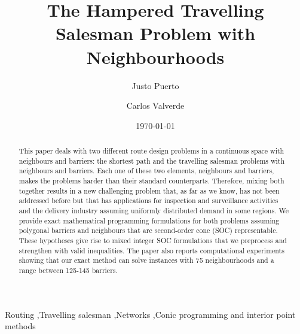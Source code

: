 \documentclass[a4paper,  review, authoryear, 1p., doubleblind]{elsarticle}
\begin{document}
	
	\begin{frontmatter}
		
		\title{The Hampered Travelling Salesman Problem with Neighbourhoods}
		
		\author[1]{Justo Puerto }%
		
		\author[2]{Carlos Valverde }
		
		\address[1]{Department of Statistics and Operations Research, University of Seville, Seville, 41012, Spain}
		\address[2]{Department of Statistics and Operations Research, University of Seville, Seville, 41012, Spain}
		
		
		\date{\today}
		
		
		\begin{abstract}
			This paper deals with two different route design problems in a continuous space with neighbours and barriers: the shortest path and the travelling salesman problems with neighbours and barriers. Each one of these two elements, neighbours and barriers, makes the problems harder than their standard counterparts. Therefore, mixing both together results in a new challenging problem that, as far as we know, has not been addressed before but that has applications for inspection and surveillance activities and the delivery industry assuming uniformly distributed demand in some regions.
			We provide exact mathematical programming formulations for both problems assuming polygonal barriers and neighbours that are second-order cone (SOC) representable. These hypotheses give rise to mixed integer SOC formulations that we preprocess and strengthen with valid inequalities. The paper also reports computational experiments showing that our exact method can solve instances with 75 neighbourhoods and a range between 125-145 barriers.
		\end{abstract}
		
		\begin{keyword}
			Routing \sep Travelling salesman \sep Networks \sep Conic programming and interior point methods
		\end{keyword}
		
	\end{frontmatter}
	
\end{document}
